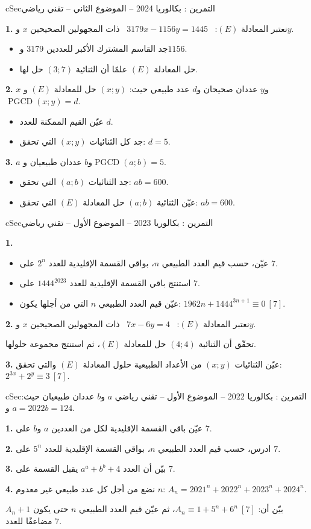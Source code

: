 \documentclass[12pt,a4paper]{article}
\newenvironment{BOX}[2]{\begin{otherlanguage}{english}\begin{arbox}{#1}{#2}}{\end{arbox}\end{otherlanguage}}
\newcounter{exo}
\newenvironment{tamrin}[1]{\stepcounter{exo}\begin{BOX}{cSec}{التمرين \theexo: #1}}{\end{BOX}}
\newcommand{\pgcd}{\operatorname{PGCD}}
\newenvironment{sq}{\begin{itemize}[leftmargin=2.4em,itemsep=3pt]}{\end{itemize}}
\newcommand{\qa}{\item[(أ)]}\newcommand{\qb}{\item[(ب)]}\newcommand{\qc}{\item[(جـ)]}\newcommand{\qd}{\item[(د)]}\newcommand{\qe}{\item[(هـ)]}
\newcommand{\QQ}[1]{\par\smallskip\textbf{#1.} }
\begin{document}
\begin{tamrin}{بكالوريا 2024 -- الموضوع الثاني -- تقني رياضي}
\QQ{1} نعتبر المعادلة $(E)$: \ $3179x-1156y=1445$ \ ذات المجهولين الصحيحين $x$ و$y$.
\begin{sq}
\qa جد القاسم المشترك الأكبر للعددين $3179$ و$1156$.
\qb حل المعادلة $(E)$ علمًا أن الثنائية $(3;7)$ حل لها.
\end{sq}
\QQ{2} $x$ و$y$ عددان صحيحان و$d$ عدد طبيعي حيث: $(x;y)$ حل للمعادلة $(E)$ و$\pgcd(x;y)=d$.
\begin{sq}
\qa عيّن القيم الممكنة للعدد $d$.
\qb جد كل الثنائيات $(x;y)$ التي تحقق: $d=5$.
\end{sq}
\QQ{3} $a$ و$b$ عددان طبيعيان و$\pgcd(a;b)=5$.
\begin{sq}
\qa جد الثنائيات $(a;b)$ التي تحقق: $ab=600$.
\qb عيّن الثنائية $(a;b)$ حل المعادلة $(E)$ التي تحقق: $ab=600$.
\end{sq}
\end{tamrin}

\begin{tamrin}{بكالوريا 2023 -- الموضوع الأول -- تقني رياضي}
\QQ{1}
\begin{sq}
\qa عيّن، حسب قيم العدد الطبيعي $n$، بواقي القسمة الإقليدية للعدد $2^n$ على $7$.
\qb استنتج باقي القسمة الإقليدية للعدد $1444^{2023}$ على $7$.
\qc عيّن قيم العدد الطبيعي $n$ التي من أجلها يكون: $1962n+1444^{3n+1}\equiv 0\ [7]$.
\end{sq}
\QQ{2} نعتبر المعادلة $(E)$: \ $7x-6y=4$ \ ذات المجهولين الصحيحين $x$ و$y$.

تحقّق أن الثنائية $(4;4)$ حل للمعادلة $(E)$، ثم استنتج مجموعة حلولها.
\QQ{3} عيّن الثنائيات $(x;y)$ من الأعداد الطبيعية حلول المعادلة $(E)$ والتي تحقق: $2^{3x}+2^y\equiv 3\ [7]$.
\end{tamrin}

\begin{tamrin}{بكالوريا 2022 -- الموضوع الأول -- تقني رياضي}
$a$ و$b$ عددان طبيعيان حيث: $a=2022$ و$b=124$.
\QQ{1} عيّن باقي القسمة الإقليدية لكل من العددين $a$ و$b$ على $7$.
\QQ{2} ادرس، حسب قيم العدد الطبيعي $n$، بواقي القسمة الإقليدية للعدد $5^n$ على $7$.
\QQ{3} بيّن أن العدد $a^a+b^b+4$ يقبل القسمة على $7$.
\QQ{4} نضع من أجل كل عدد طبيعي غير معدوم $n$: $A_n=2021^n+2022^n+2023^n+2024^n$.

بيّن أن: $A_n\equiv 1+5^n+6^n\ [7]$، ثم عيّن قيم العدد الطبيعي $n$ حتى يكون $A_n+1$ مضاعفًا للعدد $7$.
\end{tamrin}
\end{document}
